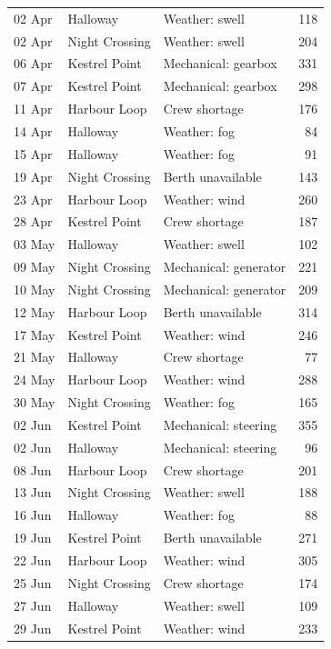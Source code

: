 \documentclass[11pt,a4paper]{report}
\begin{document}
\begin{longtable}{lllr}
  02 Apr & Halloway       & Weather: swell        & 118 \\
  02 Apr & Night Crossing & Weather: swell        & 204 \\
  06 Apr & Kestrel Point  & Mechanical: gearbox   & 331 \\
  07 Apr & Kestrel Point  & Mechanical: gearbox   & 298 \\
  11 Apr & Harbour Loop   & Crew shortage         & 176 \\
  14 Apr & Halloway       & Weather: fog          &  84 \\
  15 Apr & Halloway       & Weather: fog          &  91 \\
  19 Apr & Night Crossing & Berth unavailable     & 143 \\
  23 Apr & Harbour Loop   & Weather: wind         & 260 \\
  28 Apr & Kestrel Point  & Crew shortage         & 187 \\
  03 May & Halloway       & Weather: swell        & 102 \\
  09 May & Night Crossing & Mechanical: generator & 221 \\
  10 May & Night Crossing & Mechanical: generator & 209 \\
  12 May & Harbour Loop   & Berth unavailable     & 314 \\
  17 May & Kestrel Point  & Weather: wind         & 246 \\
  21 May & Halloway       & Crew shortage         &  77 \\
  24 May & Harbour Loop   & Weather: wind         & 288 \\
  30 May & Night Crossing & Weather: fog          & 165 \\
  02 Jun & Kestrel Point  & Mechanical: steering  & 355 \\
  02 Jun & Halloway       & Mechanical: steering  &  96 \\
  08 Jun & Harbour Loop   & Crew shortage         & 201 \\
  13 Jun & Night Crossing & Weather: swell        & 188 \\
  16 Jun & Halloway       & Weather: fog          &  88 \\
  19 Jun & Kestrel Point  & Berth unavailable     & 271 \\
  22 Jun & Harbour Loop   & Weather: wind         & 305 \\
  25 Jun & Night Crossing & Crew shortage         & 174 \\
  27 Jun & Halloway       & Weather: swell        & 109 \\
  29 Jun & Kestrel Point  & Weather: wind         & 233 \\
\end{longtable}
\end{document}
